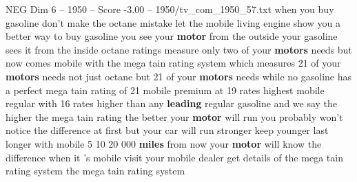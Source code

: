 \begin{textsample}{NEG Dim 6 – 1950 – Score -3.00 – 1950/tv\_com\_1950\_57.txt}  \label{ex:f6_neg_086}
when you buy gasoline don't make the octane mistake let the mobile living engine show you a better way to buy gasoline you see your \textbf{motor} from the outside your gasoline sees it from the inside octane ratings measure only two of your \textbf{motors} needs but now comes mobile with the mega tain rating system which measures 21 of your \textbf{motors} needs not just octane but 21 of your \textbf{motors} needs while no gasoline has a perfect mega tain rating of 21 mobile premium at 19 rates highest mobile regular with 16 rates higher than any \textbf{leading} regular gasoline and we say the higher the mega tain rating the better your \textbf{motor} will run you probably won't notice the difference at first but your car will run stronger keep younger last longer with mobile 5 10 20 000 \textbf{miles} from now your \textbf{motor} will know the difference when it 's mobile visit your mobile dealer get details of the mega tain rating system the mega tain rating system

\end{textsample}
